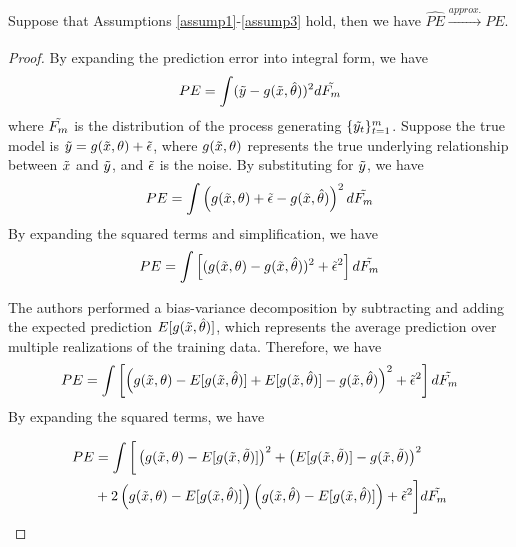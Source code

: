 \documentclass[12pt, oneside]{amsart}
\newenvironment{customthm}[1]
  {\renewcommand\theinnercustomthm{#1}\innercustomthm}
  {\endinnercustomthm}
\theoremstyle{definition}
\theoremstyle{remark}
\numberwithin{equation}{section}
\begin{document}
\begin{customthm}{1}\label{thm1}
Suppose that Assumptions \ref{assump1}-\ref{assump3} hold, then we have $\hat{PE} \xrightarrow[]{approx.} PE$. 
\end{customthm}
\begin{proof}
    
By expanding the prediction error into integral form, we have
$$PE = \int (\Tilde{y} - g(\Tilde{x},\hat{\theta}))^2 d\Tilde{F_m}$$
where $\Tilde{F_m}$ is the distribution of the process generating $\{\Tilde{y_t}\}^m_{t=1}$. Suppose the true model is $\Tilde{y} = g(\Tilde{x}, \theta) + \Tilde{\epsilon}$, where $g(\Tilde{x}, \theta)$ represents the true underlying relationship between $\Tilde{x}$ and $\Tilde{y}$, and $\Tilde{\epsilon}$ is the noise. By substituting for $\Tilde{y}$, we have 
$$PE = \int \left( g(\Tilde{x}, \theta) + \Tilde{\epsilon} - g(\Tilde{x},\hat{\theta}) \right)^2 d\Tilde{F_m}$$ By expanding the squared terms and simplification, we have 
$$PE = \int \left[ (g(\Tilde{x}, \theta) - g(\Tilde{x},\hat{\theta}))^2 + \Tilde{\epsilon}^ 2 \right] d\Tilde{F_m}$$

The authors performed a bias-variance decomposition by subtracting and adding the expected prediction $E[g(\Tilde{x}, \hat{\theta})]$, which represents the average prediction over multiple realizations of the training data. Therefore, we have 
$$ PE = \int \left[ \left(g(\Tilde{x}, \theta) - E[g(\Tilde{x}, \hat{\theta})] + E[g(\Tilde{x}, \hat{\theta})] - g(\Tilde{x},\hat{\theta})\right)^2 + \Tilde{\epsilon}^2 \right] d\Tilde{F_m}$$ By expanding the squared terms, we have

\begin{align*}
    PE &= \int \bigg[ \left(g(\tilde{x},\theta) - E[g(\tilde{x},\tilde{\theta})]\right)^2 + \left(E[g(\tilde{x},\tilde{\theta})] - g(\tilde{x}, \tilde{\theta})\right)^2 \\
    &+ 2 \left( g(\tilde{x}, \theta) - E[g(\tilde{x}, \hat{\theta})]\right) \left( g(\tilde{x},\hat{\theta}) - E[g(\tilde{x}, \hat{\theta})] \right) + \tilde{\epsilon}^2 \bigg] d\Tilde{F_m} 
\end{align*}


\end{proof}
\end{document}

